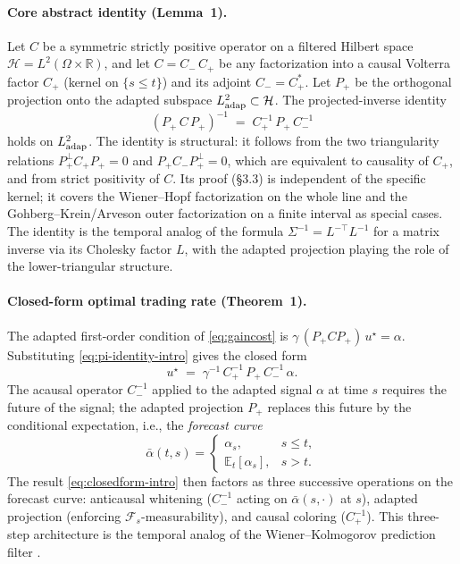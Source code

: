\documentclass[11pt]{article}
\newcommand{\R}{\mathbb{R}}
\newcommand{\E}{\mathbb{E}}
\newcommand{\F}{\mathcal{F}}
\newcommand{\Hilb}{\mathcal{H}}
\newcommand{\adap}{{\rm adap}}
\theoremstyle{plain}
\begin{document}
\paragraph{Core abstract identity (Lemma~1).}
Let $C$ be a symmetric strictly positive operator on a filtered Hilbert space $\Hilb = L^2(\Omega\times\R)$, and let $C = C_-\,C_+$ be any factorization into a causal Volterra factor $C_+$ (kernel on $\{s\le t\}$) and its adjoint $C_- = C_+^*$. Let $P_+$ be the orthogonal projection onto the adapted subspace $L^2_{\adap}\subset\Hilb$. The projected-inverse identity
\begin{equation}\label{eq:pi-identity-intro}
(P_+\, C\, P_+)^{-1} \;=\; C_+^{-1}\, P_+\, C_-^{-1}
\end{equation}
holds on $L^2_{\adap}$. The identity is structural: it follows from the two triangularity relations $P_+^\perp C_+ P_+ = 0$ and $P_+ C_- P_+^\perp = 0$, which are equivalent to causality of $C_+$, and from strict positivity of $C$. Its proof (\S3.3) is independent of the specific kernel; it covers the Wiener--Hopf factorization on the whole line and the Gohberg--Krein/Arveson outer factorization on a finite interval as special cases. The identity is the temporal analog of the formula $\Sigma^{-1} = L^{-\top}L^{-1}$ for a matrix inverse via its Cholesky factor $L$, with the adapted projection playing the role of the lower-triangular structure.

\paragraph{Closed-form optimal trading rate (Theorem~1).}
The adapted first-order condition of \eqref{eq:gaincost} is $\gamma\,(P_+CP_+)\,u^\star = \alpha$. Substituting \eqref{eq:pi-identity-intro} gives the closed form
\begin{equation}\label{eq:closedform-intro}
u^\star \;=\; \gamma^{-1}\, C_+^{-1}\, P_+\, C_-^{-1}\,\alpha.
\end{equation}
The acausal operator $C_-^{-1}$ applied to the adapted signal $\alpha$ at time $s$ requires the future of the signal; the adapted projection $P_+$ replaces this future by the conditional expectation, i.e., the \emph{forecast curve}
\[
\bar\alpha(t,s) = \begin{cases}\alpha_s, & s\le t,\\ \E_t[\alpha_s], & s>t.\end{cases}
\]
The result \eqref{eq:closedform-intro} then factors as three successive operations on the forecast curve: anticausal whitening ($C_-^{-1}$ acting on $\bar\alpha(s,\cdot)$ at $s$), adapted projection (enforcing $\F_s$-measurability), and causal coloring ($C_+^{-1}$). This three-step architecture is the temporal analog of the Wiener--Kolmogorov prediction filter \citep{Wiener1949}.
\end{document}
